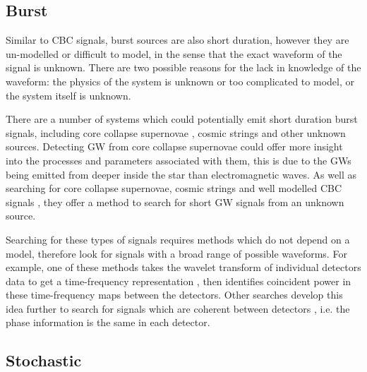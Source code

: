 \subsection{\label{intro:sources:burst}Burst}

Similar to \gls{CBC} signals, burst sources are also short duration, however they are un-modelled or
difficult to model, in the sense that the exact waveform of the signal is
unknown.  There are two possible reasons for the lack in knowledge of the
waveform: the physics of the system is unknown or too complicated to model, or the system itself is unknown.  

There are a number of systems which could potentially emit short duration burst signals, including core collapse supernovae \citep{ott2008GravitationalWave}, cosmic strings
\citep{damour2005GravitationalRadiation} and other unknown sources.  Detecting
\gls{GW} from core collapse supernovae could offer more insight into the processes
and parameters associated with them, this is due to the \glspl{GW} being emitted from deeper inside the star than electromagnetic waves.
As well as searching for core collapse supernovae, cosmic strings and well modelled \gls{CBC} signals \citep{aasi2014SearchGravitational}, they offer a method to search for short \gls{GW} signals from an unknown source. 

Searching for these types of signals requires methods which do not depend on a model, therefore look for signals with a broad range of possible waveforms.
For example, one of these methods takes the wavelet transform of individual detectors data to get a time-frequency representation \citep{klimenko2004PerformanceWaveBurst}, then identifies coincident power in these time-frequency maps between the detectors. 
Other searches develop this idea further to search for signals which are coherent between detectors \citep{cornish2015BayeswaveBayesian, klimenko2008CoherentMethod}, i.e. the phase information is the same in each detector.


\subsection{Stochastic}

